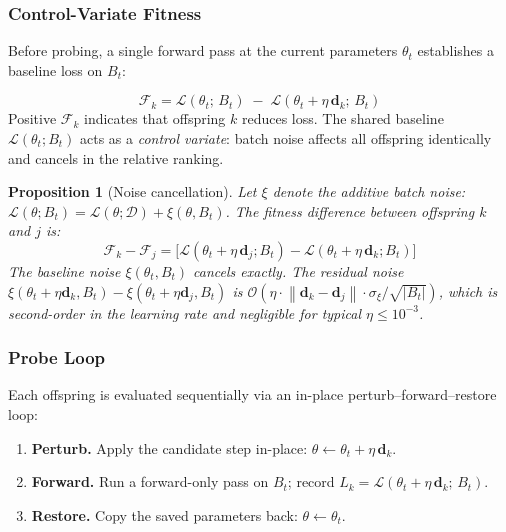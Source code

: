 \documentclass[12pt]{article}
\newcommand{\eqbox}[2]{%
  \begin{tcolorbox}[eqstyle, title={#1}]
    #2
  \end{tcolorbox}
}
\newtheorem{proposition}{Proposition}
\newcommand{\norm}[1]{\left\lVert#1\right\rVert}
\newcommand{\Loss}{\mathcal{L}}
\begin{document}
\subsubsection{Control-Variate Fitness}

Before probing, a single forward pass at the current parameters
$\theta_t$ establishes a baseline loss on $B_t$:

\eqbox{Definition 2 --- Probe Fitness}{
\begin{equation}
  \mathcal{F}_k = \Loss(\theta_t;\, B_t)
    \;-\; \Loss(\theta_t + \eta\,\mathbf{d}_k;\, B_t)
  \label{eq:fitness}
\end{equation}
\smallskip
Positive $\mathcal{F}_k$ indicates that offspring $k$ reduces loss.
The shared baseline $\Loss(\theta_t; B_t)$ acts as a \emph{control variate}:
batch noise affects all offspring identically and cancels in the
relative ranking.
}

\begin{proposition}[Noise cancellation]
\label{prop:noise}
Let $\xi$ denote the additive batch noise:
$\Loss(\theta; B_t) = \Loss(\theta; \mathcal{D}) + \xi(\theta, B_t)$.
The fitness difference between offspring $k$ and $j$ is:
\begin{equation*}
  \mathcal{F}_k - \mathcal{F}_j
  = \bigl[\Loss(\theta_t + \eta\,\mathbf{d}_j; B_t)
    - \Loss(\theta_t + \eta\,\mathbf{d}_k; B_t)\bigr]
\end{equation*}
The baseline noise $\xi(\theta_t, B_t)$ cancels exactly.
The residual noise $\xi(\theta_t + \eta\mathbf{d}_k, B_t)
- \xi(\theta_t + \eta\mathbf{d}_j, B_t)$ is
$\mathcal{O}(\eta \cdot \norm{\mathbf{d}_k - \mathbf{d}_j} \cdot
\sigma_\xi / \sqrt{|B_t|})$, which is second-order in the learning rate
and negligible for typical $\eta \leq 10^{-3}$.
\end{proposition}

\subsubsection{Probe Loop}

Each offspring is evaluated sequentially via an in-place
perturb--forward--restore loop:

\begin{enumerate}[leftmargin=1.8em, itemsep=3pt]
  \item \textbf{Perturb.} Apply the candidate step in-place:
    $\theta \leftarrow \theta_t + \eta\,\mathbf{d}_k$.
  \item \textbf{Forward.} Run a forward-only pass on $B_t$;
    record $L_k = \Loss(\theta_t + \eta\,\mathbf{d}_k;\, B_t)$.
  \item \textbf{Restore.} Copy the saved parameters back:
    $\theta \leftarrow \theta_t$.
\end{enumerate}
\end{document}
